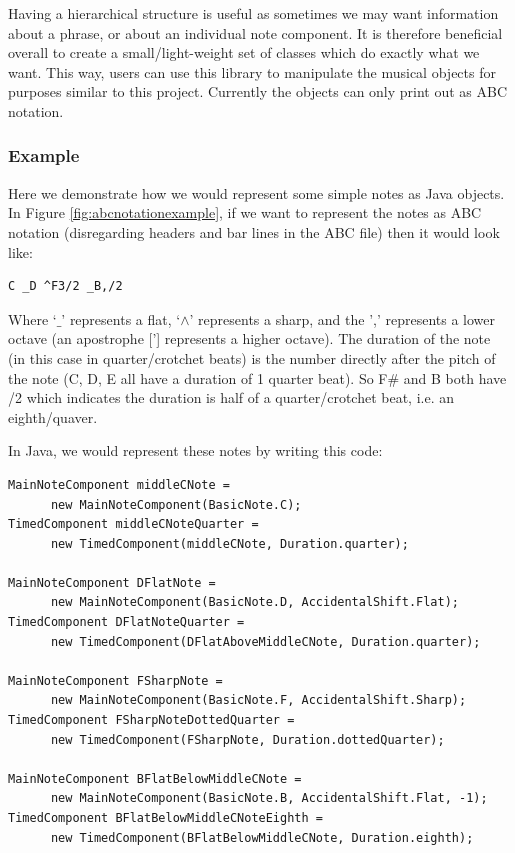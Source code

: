 \documentclass[pdftex,12pt,a4paper]{report}
\begin{document}
Having a hierarchical structure is useful as sometimes we may want information about a phrase, or about an individual note component. It is therefore beneficial overall to create a small/light-weight set of classes which do exactly what we want. This way, users can use this library to manipulate the musical objects for purposes similar to this project. Currently the objects can only print out as ABC notation.

\subsubsection{Example}
Here we demonstrate how we would represent some simple notes as Java objects. In Figure \ref{fig:abcnotationexample}, if we want to represent the notes as ABC notation (disregarding headers and bar lines in the ABC file) then it would look like:

\begin{verbatim}
C _D ^F3/2 _B,/2
\end{verbatim}

Where `$\_$' represents a flat, `$\wedge$' represents a sharp, and the ',' represents a lower octave (an apostrophe ['] represents a higher octave). The duration of the note (in this case in quarter/crotchet beats) is the number directly after the pitch of the note (C, D, E all have a duration of 1 quarter beat). So F\# and B both have /2 which indicates the duration is half of a quarter/crotchet beat, i.e. an eighth/quaver.

In Java, we would represent these notes by writing this code:

\begin{lstlisting}
MainNoteComponent middleCNote = 
      new MainNoteComponent(BasicNote.C);
TimedComponent middleCNoteQuarter = 
      new TimedComponent(middleCNote, Duration.quarter);

MainNoteComponent DFlatNote = 
      new MainNoteComponent(BasicNote.D, AccidentalShift.Flat);
TimedComponent DFlatNoteQuarter = 
      new TimedComponent(DFlatAboveMiddleCNote, Duration.quarter);

MainNoteComponent FSharpNote = 
      new MainNoteComponent(BasicNote.F, AccidentalShift.Sharp);
TimedComponent FSharpNoteDottedQuarter = 
      new TimedComponent(FSharpNote, Duration.dottedQuarter);

MainNoteComponent BFlatBelowMiddleCNote = 
      new MainNoteComponent(BasicNote.B, AccidentalShift.Flat, -1);
TimedComponent BFlatBelowMiddleCNoteEighth = 
      new TimedComponent(BFlatBelowMiddleCNote, Duration.eighth);

\end{lstlisting}
\end{document}
